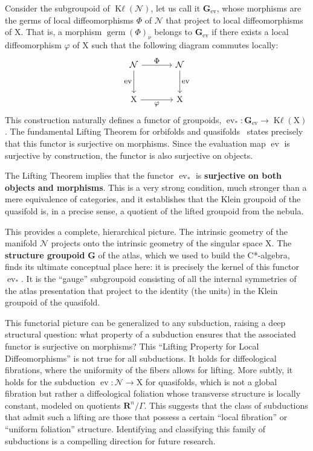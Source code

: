 \documentclass[10pt,reqno,letterpaper,twoside]{amsart}
\theoremstyle{article}
\newcommand{\RR}{\mathbf{R}}
\newcommand{\GG}{\mathbf{G}}
\newcommand{\cN}{{\mathcal N}}
\def \K{\mathrm K}
\def \X{\mathrm X}
\DeclareMathOperator{\ev}{ev}
\DeclareMathOperator{\germ}{germ}
\DeclareMathOperator{\Kl}{{\K\ell}}
\begin{document}
  Consider the subgroupoid of $\Kl(\cN)$,
  let us call it $\GG_{\ev}$,
  whose morphisms are the germs of local diffeomorphisms $\Phi$ of $\cN$ that project to local diffeomorphisms of $\X$.
  That is,
  a morphism $\germ(\Phi)_\nu$ belongs to $\GG_{\ev}$ if there exists a local diffeomorphism $\varphi$ of $\X$ such that the following diagram commutes locally:
  \[
  \begin{tikzcd}[column sep=large, row sep=large, every label/.append style = {font = \small}]
    \cN \arrow[d, swap, "\ev"] \arrow[r, "\Phi"] & \cN \arrow[d, "\ev"] \\
    \X \arrow[r, swap, "\varphi"] & \X
  \end{tikzcd}
  \]
  This construction naturally defines a functor of groupoids,
  $\ev_*: \GG_{\ev} \to \Kl(\X)$.
  The fundamental Lifting Theorem for orbifolds and quasifolds~\cite{IKZ10, IZP21} states precisely that this functor is surjective on morphisms.
  Since the evaluation map $\ev$ is surjective by construction,
  the functor is also surjective on objects.
  
  The Lifting Theorem implies that the functor $\ev_*$ is \textbf{surjective on both objects and morphisms}.
  This is a very strong condition, much stronger than a mere equivalence of categories,
  and it establishes that the Klein groupoid of the quasifold is,
  in a precise sense,
  a quotient of the lifted groupoid from the nebula.
  
  This provides a complete,
  hierarchical picture.
  The intrinsic geometry of the manifold $\cN$ projects onto the intrinsic geometry of the singular space $\X$.
  The \textbf{structure groupoid} $\GG$ of the atlas,
  which we used to build the C*-algebra, finds its ultimate conceptual place here:
  it is precisely the kernel of this functor $\ev_*$.
  It is the ``gauge'' subgroupoid consisting of all the internal symmetries of the atlas presentation that project to the identity (the units) in the Klein groupoid of the quasifold.
  
  This functorial picture can be generalized to any subduction,
  raising a deep structural question: what property of a subduction ensures that the associated functor is surjective on morphisms?
  This ``Lifting Property for Local Diffeomorphisms'' is not true for all subductions.
  It holds for diffeological fibrations, where the uniformity of the fibers allows for lifting.
  More subtly,
  it holds for the subduction $\ev: \cN \to \X$ for quasifolds,
  which is not a global fibration but rather a diffeological foliation whose transverse structure is locally constant,
  modeled on quotients $\RR^n/\Gamma$.
  This suggests that the class of subductions that admit such a lifting are those that possess a certain ``local fibration'' or ``uniform foliation'' structure.
  Identifying and classifying this family of subductions is a compelling direction for future research.
  
\end{document}
